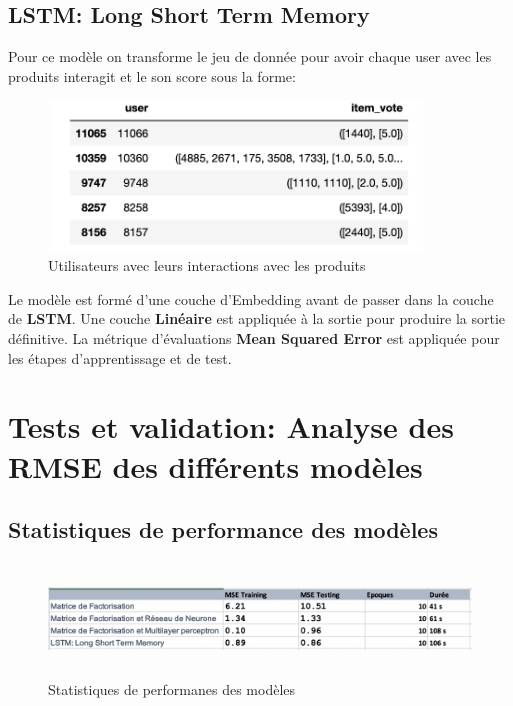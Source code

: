 \subsection{LSTM: Long Short Term Memory}
Pour ce modèle on transforme le jeu de donnée pour avoir chaque user avec les produits interagit et le son score sous la forme:
\begin{figure}[h]
\begin{center}
\includegraphics[width=10cm,height=4cm]{images/lstm_data.png}
\caption[Utilisateurs avec leurs interactions avec les produits]{Utilisateurs avec leurs interactions avec les produits}
\label{monlabel}
\end{center}
\end{figure}
Le modèle est formé d’une couche d’Embedding avant de passer dans la couche de \textbf{LSTM}.
Une couche \textbf{Linéaire} est appliquée à la sortie pour produire la sortie définitive.
La métrique d’évaluations \textbf{Mean Squared Error} est appliquée pour les étapes d’apprentissage et de test.

\clearpage
\section{Tests et validation: Analyse des RMSE des différents modèles}
\subsection{Statistiques de performance des modèles}
\begin{figure}[!htb]
\begin{center}
\includegraphics[width=16cm,height=3cm]{images/validation_statistics.png}
\caption[Statistiques de performanes des modèles]{Statistiques de performanes des modèles }
\label{monlabel}
\end{center}
\end{figure}
